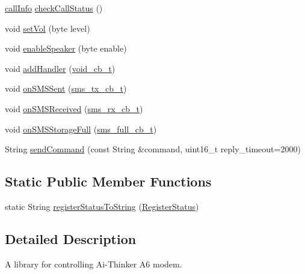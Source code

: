 \begin{DoxyCompactItemize}
\mbox{\hyperlink{structcall_info}{call\+Info}} \mbox{\hyperlink{class_a6lib_a05f56b30c3080fc64e5f4bf7d7703866}{check\+Call\+Status}} ()
\item 
void \mbox{\hyperlink{class_a6lib_a4042e45892004cd9273f1b1c85d86ffc}{set\+Vol}} (byte level)
\item 
void \mbox{\hyperlink{class_a6lib_a86acb23093b4c07f84b56d495799dd10}{enable\+Speaker}} (byte enable)
\item 
void \mbox{\hyperlink{class_a6lib_ab9580c0720252ad9e2d6b67683e3e88f}{add\+Handler}} (\mbox{\hyperlink{_a6lib_8h_a7a1b65425109a6c0a0d203c1fe9bbbe5}{void\+\_\+cb\+\_\+t}})
\item 
void \mbox{\hyperlink{class_a6lib_ac92651260eaefe715ed1e1dc798fa275}{on\+S\+M\+S\+Sent}} (\mbox{\hyperlink{_a6lib_8h_a7b74957a5e4992ea4364e91c175b5d7d}{sms\+\_\+tx\+\_\+cb\+\_\+t}})
\item 
void \mbox{\hyperlink{class_a6lib_a9503f1167ed6fd225aee3086b827803d}{on\+S\+M\+S\+Received}} (\mbox{\hyperlink{_a6lib_8h_a0c0c0674e9fa2ea70a4a13b38abdc0f9}{sms\+\_\+rx\+\_\+cb\+\_\+t}})
\item 
void \mbox{\hyperlink{class_a6lib_ac254b0457036a93d83e1a6fc296f57a0}{on\+S\+M\+S\+Storage\+Full}} (\mbox{\hyperlink{_a6lib_8h_a97f6ff1cf1ed894d22d58ebdb05b8bbf}{sms\+\_\+full\+\_\+cb\+\_\+t}})
\item 
String \mbox{\hyperlink{class_a6lib_a934e8451ed2125f0fee5bc720a99ed91}{send\+Command}} (const String \&command, uint16\+\_\+t reply\+\_\+timeout=2000)
\end{DoxyCompactItemize}
\subsection*{Static Public Member Functions}
\begin{DoxyCompactItemize}
\item 
static String \mbox{\hyperlink{class_a6lib_a92586286549a825ad30f0045b6721e6d}{register\+Status\+To\+String}} (\mbox{\hyperlink{_a6lib_8h_a0a43f46ad95cebb665a0d371219a6015}{Register\+Status}})
\end{DoxyCompactItemize}


\subsection{Detailed Description}
A library for controlling Ai-\/\+Thinker A6 modem. 

